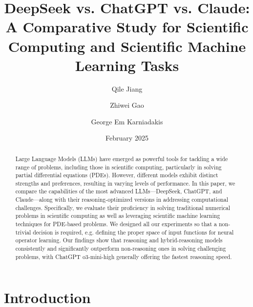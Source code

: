 \documentclass{article}
\title{DeepSeek vs. ChatGPT vs. Claude: A Comparative Study for Scientific Computing and Scientific Machine Learning Tasks}
\author[1,*]{Qile Jiang}
\author[1,*]{Zhiwei Gao}
\author[2,†]{George Em Karniadakis}
\affil[1]{School of Engineering, Brown University, Providence, RI, USA}
\affil[2]{Division of Applied Mathematics, Brown University, Providence, RI, USA}
\date{February 2025}
\begin{document}
\maketitle
\let\thefootnote\relax{}

\begin{abstract}
    Large Language Models (LLMs) have emerged as powerful tools for tackling a wide range of problems, including those in scientific computing, particularly in solving partial differential equations (PDEs). However, different models exhibit distinct strengths and preferences, resulting in varying levels of performance. In this paper, we compare the capabilities of the most advanced LLMs—DeepSeek, ChatGPT, and Claude—along with their reasoning-optimized versions in addressing computational challenges. Specifically, we evaluate their proficiency in solving traditional numerical problems in scientific computing as well as leveraging scientific machine learning techniques for PDE-based problems. We designed all our experiments so that a non-trivial decision is required, e.g. defining the proper space of input functions for neural operator learning. Our findings show that reasoning and hybrid-reasoning models consistently and significantly outperform non-reasoning ones in solving challenging problems, with ChatGPT o3-mini-high generally offering the fastest reasoning speed. 
\end{abstract}


\section{Introduction}
\end{document}
